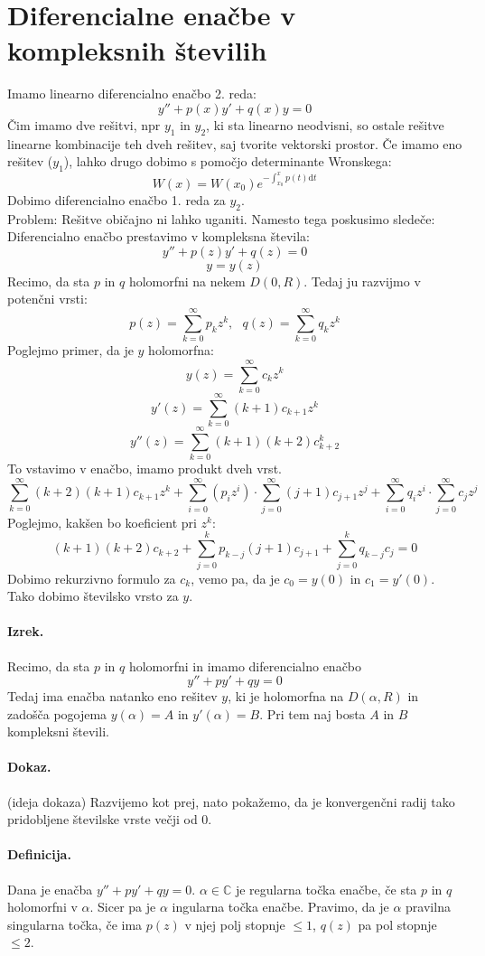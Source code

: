 \documentclass[a4paper]{article}
\newcommand{\dif}{\mathrm{d}}
\newcommand{\C}{\mathbb{C}}
\newcommand{\Sum}[2][0]{\sum_{{#2} = {#1}}^{\infty}}
\begin{document}
\section{Diferencialne enačbe v kompleksnih številih}
Imamo linearno diferencialno enačbo 2. reda:
$$y'' + p(x)y' + q(x)y = 0$$
Čim imamo dve rešitvi, npr $y_1$ in $y_2$, ki sta linearno neodvisni, so ostale rešitve linearne kombinacije teh dveh rešitev, saj tvorite vektorski prostor.
Če imamo eno rešitev ($y_1$), lahko drugo dobimo s pomočjo determinante Wronskega:
$$W(x) = W(x_0) e^{-\int_{x_0}^{x} p(t)\dif t}$$
Dobimo diferencialno enačbo 1. reda za $y_2$. \\[2mm]
Problem: Rešitve običajno ni lahko uganiti. Namesto tega poskusimo sledeče: Diferencialno enačbo prestavimo v kompleksna števila:
$$y'' + p(z) y' + q(z) = 0$$
$$y = y(z)$$
Recimo, da sta $p$ in $q$ holomorfni na nekem $D(0, R)$. Tedaj ju razvijmo v potenčni vrsti:
$$p(z) = \Sum{k}p_kz^k,~~~q(z) = \Sum{k} q_kz^k$$
Poglejmo primer, da je $y$ holomorfna:
$$y(z) = \Sum{k} c_kz^k$$
$$y'(z) = \Sum{k} (k+1)c_{k+1}z^{k}$$
$$y''(z) = \Sum{k} (k+1)(k+2)c_{k+2}^{k}$$
To vstavimo v enačbo, imamo produkt dveh vrst.
$$\Sum{k}(k+2)(k+1)c_{k+1}z^k + \Sum{i}(p_iz^i)\cdot\Sum{j}(j+1)c_{j+1}z^j + \Sum{i}q_iz^i \cdot \Sum{j} c_jz^j$$
Poglejmo, kakšen bo koeficient pri $z^k$:
$$(k+1)(k+2)c_{k+2} + \sum_{j=0}^{k}p_{k-j}(j+1)c_{j+1} + \sum_{j=0}^{k}q_{k-j}c_j = 0$$
Dobimo rekurzivno formulo za $c_k$, vemo pa, da je $c_0 = y(0)$ in $c_1 = y'(0)$. Tako dobimo številsko vrsto za $y$.
\paragraph{Izrek.} Recimo, da sta $p$ in $q$ holomorfni in imamo diferencialno enačbo
$$y'' + py' + qy = 0$$
Tedaj ima enačba natanko eno rešitev $y$, ki je holomorfna na $D(\alpha, R)$ in zadošča pogojema $y(\alpha) = A$ in $y'(\alpha) = B$.
Pri tem naj bosta $A$ in $B$ kompleksni števili.
\paragraph{Dokaz.} (ideja dokaza) Razvijemo kot prej, nato pokažemo, da je konvergenčni radij tako pridobljene številske vrste večji od 0.
\paragraph{Definicija.} Dana je enačba $y'' + py' + qy = 0$. $\alpha \in \C$ je regularna točka enačbe, če sta $p$ in $q$ holomorfni v $\alpha$. Sicer pa je $\alpha$ ingularna točka enačbe.
Pravimo, da je $\alpha$ pravilna singularna točka, če ima $p(z)$ v njej polj stopnje $\leq 1$, $q(z)$ pa pol stopnje $\leq 2$.
\end{document}
